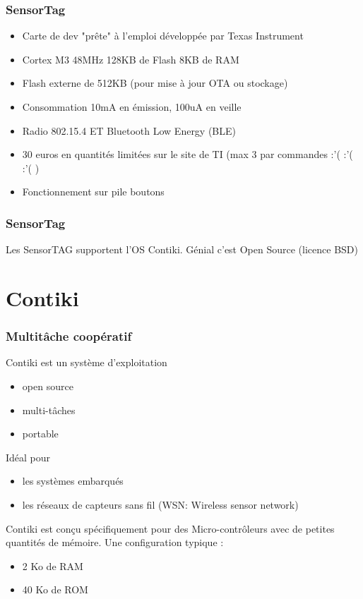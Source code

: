 \documentclass{smilebeamer}
\begin{document}
\begin{frame}
\frametitle{SensorTag}
\begin{itemize}
\item Carte de dev "prête" à l’emploi développée par Texas Instrument
\item Cortex M3 48MHz 128KB de Flash 8KB de RAM
\item Flash externe de 512KB (pour mise à jour OTA ou stockage)
\item Consommation 10mA en émission, 100uA en veille
\item Radio 802.15.4 ET Bluetooth Low Energy (BLE)
\item 30 euros en quantités limitées sur le site de TI (max 3 par commandes :'( :'( :'( )
\item Fonctionnement sur pile boutons
\end{itemize}
\end{frame}

\begin{frame}
\frametitle{SensorTag}

Les SensorTAG supportent l'OS Contiki.
\newline
Génial c'est Open Source (licence BSD)

\end{frame}




\section{Contiki}


\begin{frame}
\frametitle{Multitâche coopératif}

Contiki est un système d'exploitation
\begin{itemize}
\item open source 
\item multi-tâches
\item portable
\end{itemize}

Idéal pour 
\begin{itemize}
\item les systèmes embarqués 
\item les réseaux de capteurs sans fil (WSN: Wireless sensor network) 
 \end{itemize}
 
Contiki est conçu spécifiquement pour des Micro-contrôleurs avec de petites quantités de mémoire. 
Une configuration typique :
\begin{itemize}
\item 2 Ko de RAM 
\item 40 Ko de ROM
 \end{itemize}
\end{frame}
\end{document}
